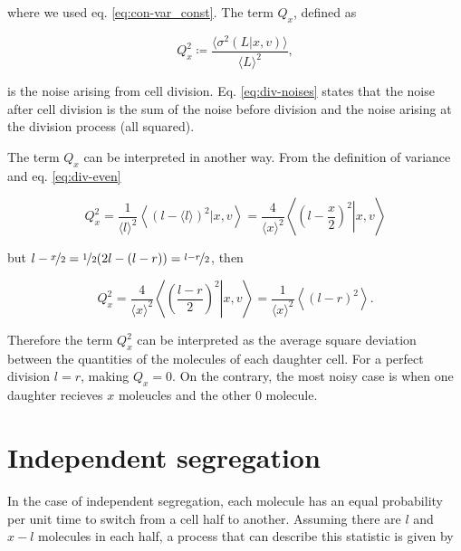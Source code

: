 where we used eq. \eqref{eq:con-var_const}. The term $Q_x$, defined as

\begin{equation}
  \label{eq:div-Q}
  Q_x^2 \coloneqq \frac{\langle\sigma^2(L|x,v)\rangle}{\langle L\rangle^2},
\end{equation}

is the noise arising from cell division. Eq. \eqref{eq:div-noises} states that the noise after cell division is the sum of the noise before division and the noise arising at the division process (all squared).

The term $Q_x$ can be interpreted in another way. From the definition of variance and eq. \eqref{eq:div-even}

\begin{equation*}
  Q_x^2 = \frac{1}{\langle l\rangle^2}\left\langle\left(l-\langle l\rangle\right)^2|x,v\right\rangle = \frac{4}{\langle x\rangle^2}\left\langle\left.\left(l-\frac{x}{2}\right)^2\right|x,v\right\rangle
\end{equation*}

but $l - \nicefrac{x}{2} = \nicefrac{1}{2}(2l-(l-r)) = \nicefrac{l-r}{2}$, then

\begin{equation*}
   Q_x^2 = \frac{4}{\langle x\rangle^2}\left\langle\left.\left(\frac{l-r}{2}\right)^2\right|x,v\right\rangle  = \frac{1}{\langle x\rangle^2}\left\langle\left(l-r\right)^2\right\rangle.
\end{equation*}


Therefore the term $Q_x^2$ can be interpreted as the average square deviation between the quantities of the molecules of each daughter cell. For a perfect division $l=r$, making $Q_x=0$. On the contrary, the most noisy case is when one daughter recieves $x$ moleucles and the other $0$ molecule.


\section{Independent segregation}

In the case of independent segregation, each molecule has an equal probability per unit time to switch from a cell half to another. Assuming there are $l$ and $x-l$ molecules in each half, a process that can describe this statistic is given by

